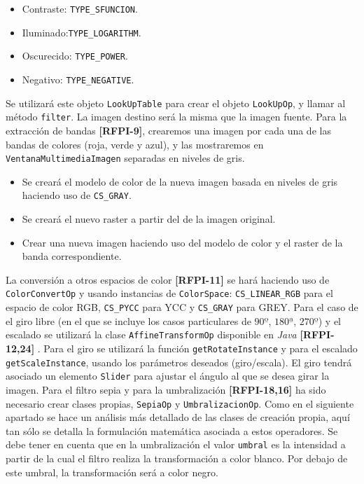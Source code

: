 \begin{itemize}
\item{Contraste: \texttt{TYPE\_SFUNCION}.}
\item{Iluminado:\texttt{TYPE\_LOGARITHM}.}
\item{Oscurecido: \texttt{TYPE\_POWER}.}
\item{Negativo: \texttt{TYPE\_NEGATIVE}.}
\end{itemize}
Se utilizará este objeto \texttt{LookUpTable} para crear el objeto \texttt{LookUpOp}, y llamar al método \texttt{filter}. La imagen destino será la misma que la imagen fuente.  
\vskip0.3cm
Para la extracción de bandas \textbf{[RFPI-9]}, crearemos una imagen por cada una de las bandas de colores (roja, verde y azul), y las mostraremos en \texttt{VentanaMultimediaImagen} separadas en niveles de gris.
\begin{itemize}
\item{Se creará el modelo de color de la nueva imagen basada en niveles de gris haciendo uso de \texttt{CS\_GRAY}.}
\item{Se creará el nuevo raster a partir del de la imagen original.}
\item{Crear una nueva imagen haciendo uso del modelo de color y el raster de la banda correspondiente.}
\end{itemize}
\vskip0.3cm
La conversión a otros espacios de color \textbf{[RFPI-11]} se hará haciendo uso de \texttt{ColorConvertOp} y usando instancias de \texttt{ColorSpace}: \texttt{CS\_LINEAR\_RGB} para el espacio de color RGB, \texttt{CS\_PYCC} para YCC y \texttt{CS\_GRAY} para GREY.
\vskip0.3cm
Para el caso de el giro libre (en el que se incluye los casos particulares de $90º$, $180ª$, $270º$) y el escalado se utilizará la clase \texttt{AffineTransformOp} disponible en \textit{Java} \textbf{[RFPI-12,24]} . Para el giro se utilizará la función \texttt{getRotateInstance} y para el escalado \texttt{getScaleInstance}, usando los parámetros deseados (giro/escala). El giro tendrá asociado un elemento \texttt{Slider} para ajustar el ángulo al que se desea girar la imagen.
\vskip0.3cm
Para el filtro sepia y para la umbralización \textbf{[RFPI-18,16]} ha sido necesario crear clases propias, \texttt{SepiaOp} y \texttt{UmbralizacionOp}. Como en el siguiente apartado se hace un análisis más detallado de las clases de creación propia, aquí tan sólo se detalla la formulación matemática asociada a estos operadores.\vskip0.3cm
Se debe tener en cuenta que en la umbralización el valor \texttt{umbral} es la intensidad a partir de la cual el filtro realiza la transformación a color blanco. Por debajo de este umbral, la transformación será a color negro.

